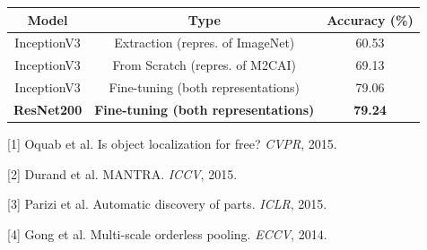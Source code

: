 \documentclass[landscape,a0paper,fontscale=0.292]{baposter}
\begin{document}
\begin{poster}
{\begin{minipage}[t]{8cm}


	\begin{center}
		\begin{tabular}{|c|c|c|}
			\hline
			Model & Type & Accuracy (\%) \\
			\hline\hline
			InceptionV3 & Extraction (repres. of ImageNet)& 60.53 \\
			InceptionV3 & From Scratch (repres. of M2CAI) & 69.13 \\
			InceptionV3 & Fine-tuning (both representations) & 79.06 \\
			\textbf{ResNet200} & \textbf{Fine-tuning (both representations)} & \textbf{79.24} \\
			\hline
		\end{tabular}
	\end{center}

\end{minipage} \hfill 
\begin{minipage}[t]{8cm}

\begin{center}
	\end{center}


{
\scriptsize
[1] Oquab et al. Is object localization for free? {\em CVPR}, 2015.

[2] Durand et al. MANTRA. {\em ICCV}, 2015.

[3] Parizi et al. Automatic discovery of parts. {\em ICLR}, 2015.

[4] Gong et al. Multi-scale orderless pooling. {\em ECCV}, 2014.

}

\end{minipage}


}




\end{poster}
\end{document}
